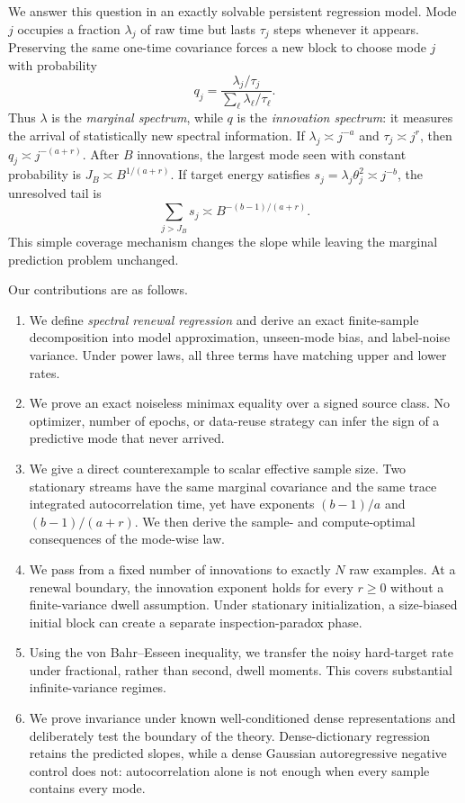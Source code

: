 We answer this question in an exactly solvable persistent regression model.
Mode $j$ occupies a fraction $\lambda_j$ of raw time but lasts $\tau_j$ steps
whenever it appears.  Preserving the same one-time covariance forces a new
block to choose mode $j$ with probability
\begin{equation}
q_j=\frac{\lambda_j/\tau_j}{\sum_\ell\lambda_\ell/\tau_\ell}.
\label{eq:intro-q}
\end{equation}
Thus $\lambda$ is the \emph{marginal spectrum}, while $q$ is the
\emph{innovation spectrum}: it measures the arrival of statistically new
spectral information.  If $\lambda_j\asymp j^{-a}$ and
$\tau_j\asymp j^r$, then $q_j\asymp j^{-(a+r)}$.  After $B$ innovations, the
largest mode seen with constant probability is
$J_B\asymp B^{1/(a+r)}$.  If target energy satisfies
$s_j=\lambda_j\theta_j^2\asymp j^{-b}$, the unresolved tail is
\begin{equation}
\sum_{j>J_B}s_j\asymp B^{-(b-1)/(a+r)}.
\label{eq:intro-mechanism}
\end{equation}
This simple coverage mechanism changes the slope while leaving the marginal
prediction problem unchanged.

Our contributions are as follows.
\begin{enumerate}
\item We define \emph{spectral renewal regression} and derive an exact
finite-sample decomposition into model approximation, unseen-mode bias, and
label-noise variance.  Under power laws, all three terms have matching upper
and lower rates.
\item We prove an exact noiseless minimax equality over a signed source class.
No optimizer, number of epochs, or data-reuse strategy can infer the sign of a
predictive mode that never arrived.
\item We give a direct counterexample to scalar effective sample size.  Two
stationary streams have the same marginal covariance and the same trace
integrated autocorrelation time, yet have exponents $(b-1)/a$ and
$(b-1)/(a+r)$.  We then derive the sample- and compute-optimal consequences of
the mode-wise law.
\item We pass from a fixed number of innovations to exactly $N$ raw examples.
At a renewal boundary, the innovation exponent holds for every $r\ge0$
without a finite-variance dwell assumption.  Under stationary initialization,
a size-biased initial block can create a separate inspection-paradox phase.
\item Using the von Bahr--Esseen inequality, we transfer the noisy hard-target
rate under fractional, rather than second, dwell moments.  This covers
substantial infinite-variance regimes.
\item We prove invariance under known well-conditioned dense representations
and deliberately test the boundary of the theory.  Dense-dictionary
regression retains the predicted slopes, while a dense Gaussian
autoregressive negative control does not: autocorrelation alone is not enough
when every sample contains every mode.
\end{enumerate}

